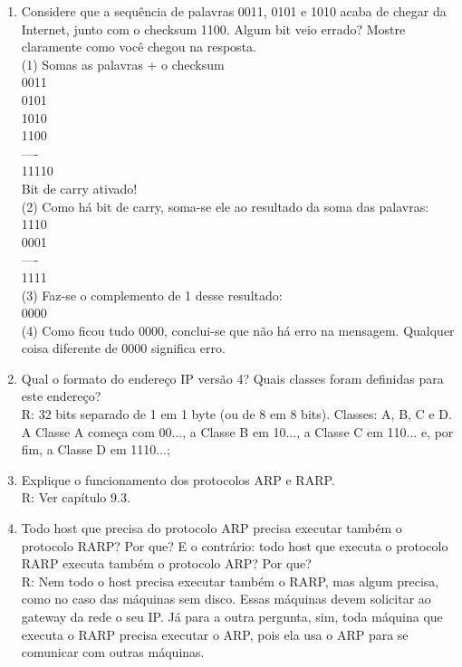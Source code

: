 \documentclass{article}
\begin{document}
\begin{enumerate}
	\item Considere que a sequência de palavras 0011, 0101 e 1010 acaba de chegar da Internet, junto com o checksum 1100. Algum bit veio errado? Mostre claramente como você chegou na resposta.
	\\(1) Somas as palavras + o checksum
	\\  0011
	\\  0101
	\\  1010
	\\  1100
	\\  ----
	\\ 11110
	\\ Bit de carry ativado!
	\\(2) Como há bit de carry, soma-se ele ao resultado da soma das palavras:
	\\  1110
	\\  0001
	\\  ----
	\\  1111
	\\(3) Faz-se o complemento de 1 desse resultado:
	\\  0000
	\\(4) Como ficou tudo 0000, conclui-se que não há erro na mensagem. Qualquer coisa diferente de 0000 significa erro.

	\item Qual o formato do endereço IP versão 4? Quais classes foram definidas para este endereço?
	\\R: 32 bits separado de 1 em 1 byte (ou de 8 em 8 bits). Classes: A, B, C e D.\\
	A Classe A começa com 00..., a Classe B em 10..., a Classe C em 110... e, por fim, a Classe D em 1110...;

	\item Explique o funcionamento dos protocolos ARP e RARP.
	\\R: Ver capítulo 9.3.

	\item Todo host que precisa do protocolo ARP precisa executar também o protocolo RARP? Por que? E o contrário: todo host que executa o protocolo RARP executa também o protocolo ARP? Por que?
	\\ R: Nem todo o host precisa executar também o RARP, mas algum precisa, como no caso das máquinas sem disco. Essas máquinas devem solicitar ao gateway da rede o seu IP. Já para a outra pergunta, sim, toda máquina que executa o RARP precisa executar o ARP, pois ela usa o ARP para se comunicar com outras máquinas.
	

\end{enumerate}
\end{document}
